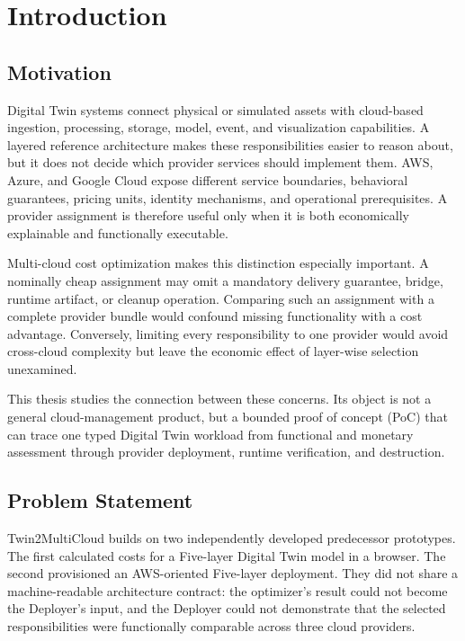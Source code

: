 \chapter{Introduction}
\label{chap:introduction}

\section{Motivation}

Digital Twin systems connect physical or simulated assets with cloud-based
ingestion, processing, storage, model, event, and visualization capabilities.
A layered reference architecture makes these responsibilities easier to
reason about, but it does not decide which provider services should implement
them. AWS, Azure, and Google Cloud expose different service boundaries,
behavioral guarantees, pricing units, identity mechanisms, and operational
prerequisites. A provider assignment is therefore useful only when it is both
economically explainable and functionally executable.

Multi-cloud cost optimization makes this distinction especially important. A
nominally cheap assignment may omit a mandatory delivery guarantee, bridge,
runtime artifact, or cleanup operation. Comparing such an assignment with a
complete provider bundle would confound missing functionality with a cost
advantage. Conversely, limiting every responsibility to one provider would
avoid cross-cloud complexity but leave the economic effect of layer-wise
selection unexamined.

This thesis studies the connection between these concerns. Its object is not a
general cloud-management product, but a bounded proof of concept (PoC) that can
trace one typed Digital Twin workload from functional and monetary assessment
through provider deployment, runtime verification, and destruction.

\section{Problem Statement}

Twin2MultiCloud builds on two independently developed predecessor prototypes.
The first calculated costs for a Five-layer Digital Twin model in a browser.
The second provisioned an AWS-oriented Five-layer deployment. They did not
share a machine-readable architecture contract: the optimizer's result could
not become the Deployer's input, and the Deployer could not demonstrate that
the selected responsibilities were functionally comparable across three cloud
providers.

